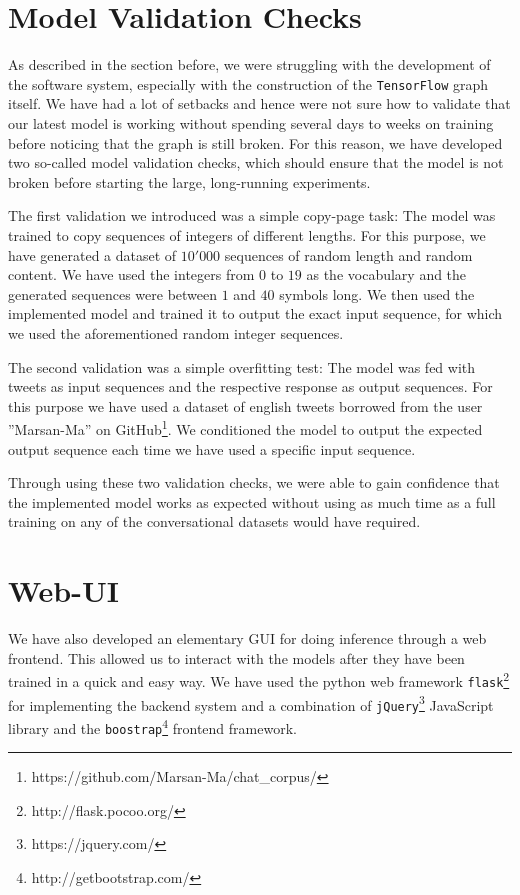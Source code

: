 \section{Model Validation Checks}
\label{software_sytem:model_validation_checks}
As described in the section before, we were struggling with the development of the software system, especially with the construction of the \texttt{TensorFlow} graph itself. We have had a lot of setbacks and hence were not sure how to validate that our latest model is working without spending several days to weeks on training before noticing that the graph is still broken. For this reason, we have developed two so-called model validation checks, which should ensure that the model is not broken before starting the large, long-running experiments.

The first validation we introduced was a simple copy-page task: The model was trained to copy sequences of integers of different lengths. For this purpose, we have generated a dataset of $10'000$ sequences of random length and random content. We have used the integers from $0$ to $19$ as the vocabulary and the generated sequences were between $1$ and $40$ symbols long. We then used the implemented model and trained it to output the exact input sequence, for which we used the aforementioned random integer sequences. 

The second validation was a simple overfitting test: The model was fed with tweets as input sequences and the respective response as output sequences. For this purpose we have used a dataset of english tweets borrowed from the user ''Marsan-Ma'' on GitHub\footnote{https://github.com/Marsan-Ma/chat\_corpus/}. We conditioned the model to output the expected output sequence each time we have used a specific input sequence.

Through using these two validation checks, we were able to gain confidence that the implemented model works as expected without using as much time as a full training on any of the conversational datasets would have required.

\section{Web-UI}
We have also developed an elementary GUI for doing inference through a web frontend. This allowed us to interact with the models after they have been trained in a quick and easy way. We have used the python web framework \texttt{flask}\footnote{http://flask.pocoo.org/} for implementing the backend system and a combination of \texttt{jQuery}\footnote{https://jquery.com/} JavaScript library and the \texttt{boostrap}\footnote{http://getbootstrap.com/} frontend framework.

